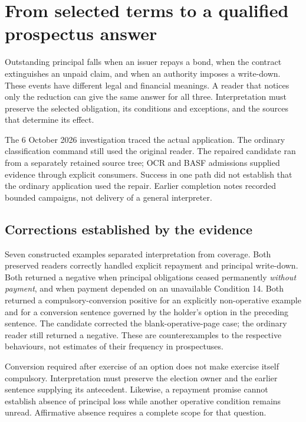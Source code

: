 \section{From selected terms to a qualified prospectus answer}
\label{sec:prospectus-delivery}

Outstanding principal falls when an issuer repays a bond, when the contract
extinguishes an unpaid claim, and when an authority imposes a write-down.
These events have different legal and financial meanings. A reader that notices
only the reduction can give the same answer for all three. Interpretation must
preserve the selected obligation, its conditions and exceptions, and the sources
that determine its effect.

The 6 October 2026 investigation traced the actual application. The ordinary
classification command still used the original reader. The repaired candidate
ran from a separately retained source tree; OCR and BASF admissions supplied
evidence through explicit consumers. Success in one path did not establish that
the ordinary application used the repair. Earlier completion notes recorded
bounded campaigns, not delivery of a general interpreter.

\subsection{Corrections established by the evidence}

Seven constructed examples separated interpretation from coverage. Both
preserved readers correctly handled explicit repayment and principal write-down.
Both returned a negative when principal obligations ceased permanently
\emph{without payment}, and when payment depended on an unavailable Condition 14.
Both returned a compulsory-conversion positive for an explicitly non-operative
example and for a conversion sentence governed by the holder's option in the
preceding sentence. The candidate corrected the blank-operative-page case; the
ordinary reader still returned a negative. These are counterexamples to the
respective behaviours, not estimates of their frequency in prospectuses.

Conversion required after exercise of an option does not make exercise itself
compulsory. Interpretation must preserve the election owner and the earlier
sentence supplying its antecedent. Likewise, a repayment promise cannot establish
absence of principal loss while another operative condition remains unread.
Affirmative absence requires a complete scope for that question.

